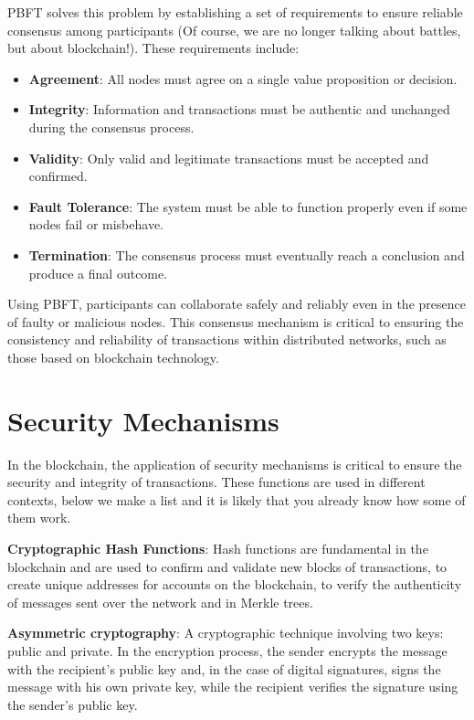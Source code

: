PBFT solves this problem by establishing a set of requirements to ensure reliable consensus among participants (Of course, we are no longer talking about battles, but about blockchain!). These requirements include:
\begin{itemize}
    \item \textbf{Agreement}: All nodes must agree on a single value proposition or decision.
    \item \textbf{Integrity}: Information and transactions must be authentic and unchanged during the consensus process.
    \item \textbf{Validity}: Only valid and legitimate transactions must be accepted and confirmed.
    \item \textbf{Fault Tolerance}: The system must be able to function properly even if some nodes fail or misbehave.
    \item \textbf{Termination}: The consensus process must eventually reach a conclusion and produce a final outcome.
\end{itemize}
Using PBFT, participants can collaborate safely and reliably even in the presence of faulty or malicious nodes. This consensus mechanism is critical to ensuring the consistency and reliability of transactions within distributed networks, such as those based on blockchain technology.

\vspace{2cm}
\section{Security Mechanisms}
In the blockchain, the application of security mechanisms is critical to ensure the security and integrity of transactions. These functions are used in different contexts, below we make a list and it is likely that you already know how some of them work.

\begin{remark}
\textbf{Cryptographic Hash Functions}:
Hash functions are fundamental in the blockchain and are used to confirm and validate new blocks of transactions, to create unique addresses for accounts on the blockchain, to verify the authenticity of messages sent over the network and in Merkle trees.
\end{remark}

\begin{remark2}
\textbf{Asymmetric cryptography}:
A cryptographic technique involving two keys: public and private. 
In the encryption process, the sender encrypts the message with the recipient's public key and, in the case of digital signatures, signs the message with his own private key, while the recipient verifies the signature using the sender's public key.
\end{remark2}

